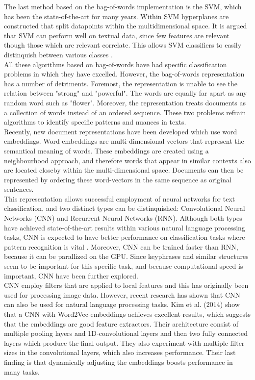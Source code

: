 The last method based on the bag-of-words implementation is the SVM, which has been the state-of-the-art for many years. Within SVM hyperplanes are constructed that split datapoints within the multidimensional space. It is argued that SVM can perform well on textual data, since few features are relevant though those which are relevant correlate. This allows SVM classifiers to easily distinquish between various classes \cite{joachims2001statistical}.\\
All these algorithms based on bag-of-words have had specific classification problems in which they have excelled. However, the bag-of-words representation has a number of detriments. Foremost, the representation is unable to see the relation between "strong" and "powerful". The words are equally far apart as any random word such as "flower". Moreover, the representation treats documents as a collection of words instead of an ordered sequence. These two problems refrain algorithms to identify specific patterns and nuances in texts.\\
Recently, new document representations have been developed which use word embeddings. Word embeddings are multi-dimensional vectors that represent the semantical meaning of words. These embeddings are created using a neighbourhood approach, and therefore words that appear in similar contexts also are located closeby within the multi-dimensional space. \cite{mikolov2013efficient} Documents can then be represented by ordering these word-vectors in the same sequence as original sentences.\\
This representation allows successful employment of neural networks for text classification, and two distinct types can be distinquished: Convolutional Neural Networks (CNN) and Recurrent Neural Networks (RNN). Although both types have achieved state-of-the-art results within various natural language processing tasks, CNN is expected to have better performance on classification tasks where pattern recognition is vital \cite{yin2017comparative}. Moreover, CNN can be trained faster than RNN, because it can be parallized on the GPU. Since keyphrases and similar structures seem to be important for this specific task, and because computational speed is important, CNN have been further explored.\\ 
CNN employ filters that are applied to local features and this has originally been used for processing image data. However, recent research has shown that CNN can also be used for natural language processing tasks. Kim et al. (2014) show that a CNN with Word2Vec-embeddings achieves excellent results, which suggests that the embeddings are good feature extractors. Their architecture consist of multiple pooling layers and 1D-convolutional layers and then two fully connected layers which produce the final output. They also experiment with multiple filter sizes in the convolutional layers, which also increases performance. Their last finding is that dynamically adjusting the embeddings boosts performance in many tasks.\\
